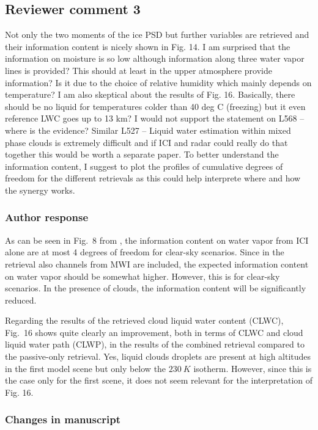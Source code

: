 \subsection*{Reviewer comment 3}

Not only the two moments of the ice PSD but further variables are retrieved and
their information content is nicely shown in Fig. 14. I am surprised that the
information on moisture is so low although information along three water vapor
lines is provided? This should at least in the upper atmosphere provide
information? Is it due to the choice of relative humidity which mainly depends
on temperature? I am also skeptical about the results of Fig. 16. Basically,
there should be no liquid for temperatures colder than 40 deg C (freezing) but
it even reference LWC goes up to 13 km? I would not support the statement on
L568 – where is the evidence? Similar L527 – Liquid water estimation within
mixed phase clouds is extremely difficult and if ICI and radar could really do
that together this would be worth a separate paper. To better understand the
information content, I suggest to plot the profiles of cumulative degrees of
freedom for the different retrievals as this could help interprete where and how
the synergy works.

\subsubsection*{Author response}

As can be seen in Fig.~8 from \cite{eriksson19}, the information content on
water vapor from ICI alone are at most 4 degrees of freedom for clear-sky
scenarios. Since in the retrieval also channels from MWI are included, the
expected information content on water vapor should be somewhat higher. However,
this is for clear-sky scenarios. In the presence of clouds, the information
content will be significantly reduced.

Regarding the results of the retrieved cloud liquid water content (CLWC),
Fig.~16 shows quite clearly an improvement, both in terms of CLWC and cloud
liquid water path (CLWP), in the results of the combined retrieval compared to
the passive-only retrieval. Yes, liquid clouds droplets are present at high
altitudes in the first model scene but only below the $230\ \unit{K}$ isotherm.
However, since this is the case only for the first scene, it does not seem
relevant for the interpretation of Fig. 16.

\subsubsection*{Changes in manuscript}

